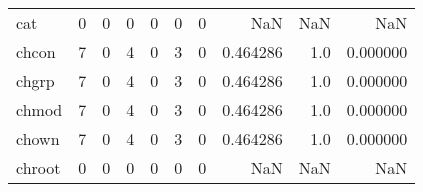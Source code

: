 \begin{longtable}{lrrrrrrrrr}
cat       &                                                  0 &                                                  0 &                                                  0 &                                                  0 &                                                  0 &                                                  0 &                                                NaN &                                    NaN &                                  NaN \\
chcon     &                                                  7 &                                                  0 &                                                  4 &                                                  0 &                                                  3 &                                                  0 &                                           0.464286 &                                    1.0 &                             0.000000 \\
chgrp     &                                                  7 &                                                  0 &                                                  4 &                                                  0 &                                                  3 &                                                  0 &                                           0.464286 &                                    1.0 &                             0.000000 \\
chmod     &                                                  7 &                                                  0 &                                                  4 &                                                  0 &                                                  3 &                                                  0 &                                           0.464286 &                                    1.0 &                             0.000000 \\
chown     &                                                  7 &                                                  0 &                                                  4 &                                                  0 &                                                  3 &                                                  0 &                                           0.464286 &                                    1.0 &                             0.000000 \\
chroot    &                                                  0 &                                                  0 &                                                  0 &                                                  0 &                                                  0 &                                                  0 &                                                NaN &                                    NaN &                                  NaN \\

\end{longtable}
